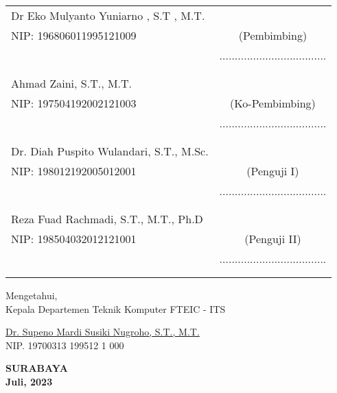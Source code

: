 \noindent
\begin{tabularx}{\textwidth}{X c}
  Dr Eko Mulyanto Yuniarno , S.T , M.T.      &                 \\
  NIP: 196806011995121009   & (Pembimbing)    \\
  & ................................... \\
  &  \\
  &  \\
  Ahmad Zaini, S.T., M.T. &                 \\
  NIP: 197504192002121003   & (Ko-Pembimbing) \\
  & ................................... \\
  &  \\
  &  \\
  Dr. Diah Puspito Wulandari, S.T., M.Sc.    &                 \\
  NIP: 198012192005012001   & (Penguji I)    \\
  & ................................... \\
  &  \\
  &  \\
  Reza Fuad Rachmadi, S.T., M.T., Ph.D  &                 \\
  NIP: 198504032012121001   & (Penguji II) \\
  & ................................... \\
  &  \\
  &  \\
\end{tabularx}
\endgroup


\begin{center}
  Mengetahui, \\
  Kepala Departemen Teknik Komputer FTEIC - ITS\\

  \vspace{8ex}

  \underline{Dr. Supeno Mardi Susiki Nugroho, S.T., M.T.} \\
  NIP. 19700313 199512 1 000
\end{center}
  
\begin{center}
  \textbf{SURABAYA\\Juli, 2023}
\end{center}
\endgroup
